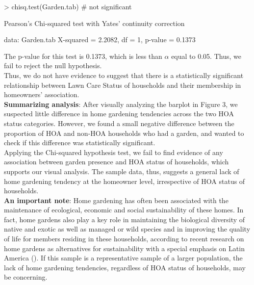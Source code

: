 \documentclass{article}
\begin{document}
\begin{Schunk}
\begin{Sinput}
> chisq.test(Garden.tab) # not significant
\end{Sinput}
\begin{Soutput}
	Pearson's Chi-squared test with Yates' continuity correction

data:  Garden.tab
X-squared = 2.2082, df = 1, p-value = 0.1373
\end{Soutput}
\end{Schunk}

The p-value for this test is 0.1373, which is less than $\alpha$ equal to 0.05. Thus, we fail to reject the null hypothesis.\\

Thus, we do not have evidence to suggest that there is a statistically significant relationship between Lawn Care Status of households and their membership in homeowners' association.\\

\textbf{Summarizing analysis}: After visually analyzing the barplot in Figure 3, we suspected little difference in home gardening tendencies across the two HOA status categories. However, we found a small negative difference between the proportion of HOA and non-HOA households who had a garden, and wanted to check if this difference was statistically significant.\\

Applying the Chi-squared hypothesis test, we fail to find evidence of any association between garden presence and HOA status of households, which supports our visual analysis. The sample data, thus, suggests a general lack of home gardening tendency at the homeowner level, irrespective of HOA status of households.\\

\textbf{An important note}: Home gardening has often been associated with the maintenance of ecological, economic and social sustainability of these homes. In fact, home gardens also play a key role in maintaining the biological diversity of native and exotic as well as managed or wild species and in improving the quality of life for members residing in these households, according to recent research on home gardens as alternatives for sustainability with a special emphasis on Latin America (\cite{homegarden}). If this sample is a representative sample of a larger population, the lack of home gardening tendencies, regardless of HOA status of households, may be concerning.\\
\end{document}
